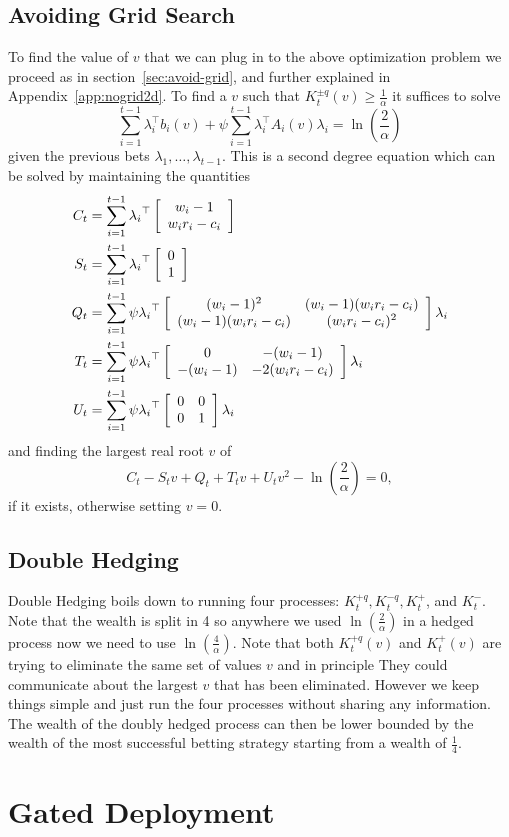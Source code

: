 \subsection{Avoiding Grid Search}
To find the value of $v$ that we can plug in to the above 
optimization problem we proceed as in section~\ref{sec:avoid-grid},
and further explained in Appendix~\ref{app:nogrid2d}.
To find a $v$ such that 
$K_t^{\pm q}(v)\geq \frac{1}{\alpha}$
it suffices to solve
\[
\sum_{i=1}^{t-1} \lambda_i^\top b_i(v) + \psi \sum_{i=1}^{t-1} \lambda_i^\top  A_i(v) \lambda_i = \ln\left(\frac{2}{\alpha}\right) 
\]
given the previous bets $\lambda_1,\ldots, \lambda_{t-1}$. This 
is a second degree equation which can be solved by maintaining 
the quantities
\begin{align*}
C_t&= \sum_{i=1}^{t-1} {\lambda_i}^\top \left[\begin{array}{c} w_i-1 \\ w_i r_i-c_i \end{array}\right] \\
S_t&= \sum_{i=1}^{t-1} {\lambda_i}^\top \left[\begin{array}{c} 0 \\ 1 \end{array}\right] \\
Q_t&= \sum_{i=1}^{t-1} \psi  {\lambda_i}^\top \left[\begin{array}{cc} (w_i-1)^2 & (w_i-1)(w_i r_i-c_i) \\ (w_i-1)(w_i r_i-c_i) & (w_ir_i-c_i)^2 \end{array}\right] \lambda_i \\
T_t&= \sum_{i=1}^{t-1} \psi  {\lambda_i}^\top \left[\begin{array}{cc} 0 & -(w_i-1) \\ -(w_i-1) & -2(w_ir_i-c_i) \end{array}\right] \lambda_i \\
U_t&=  \sum_{i=1}^{t-1} \psi {\lambda_i}^\top \left[\begin{array}{cc} 0 & 0 \\ 0 & 1 \end{array}\right] \lambda_i
\end{align*}
and finding the largest real root $v$ of
\[
C_t - S_t v + Q_t + T_t v + U_t v^2 - \ln\left(\frac{2}{\alpha}\right) = 0,
\]
if it exists, otherwise setting $v=0$.

\subsection{Double Hedging}
Double Hedging boils down to running four processes: 
$K_t^{+q}, K_t^{-q}, K_t^{+}$, and $K_t^{-}$. Note 
that the wealth is split in 4 so anywhere we used 
$\ln\left(\frac{2}{\alpha}\right)$ in a hedged process
now we need to use $\ln\left(\frac{4}{\alpha}\right)$.
Note that both $K_t^{+q}(v)$ and $K_t^{+}(v)$ are trying to 
eliminate the same set of values $v$ and in principle
They could communicate about the largest $v$ that
has been eliminated. However we keep things simple
and just run the four processes without sharing 
any information. The wealth of the doubly 
hedged process can then be lower bounded by 
the wealth of the most successful betting 
strategy starting from a wealth of $\frac{1}{4}$.

\section{Gated Deployment}
\label{app:gd}
